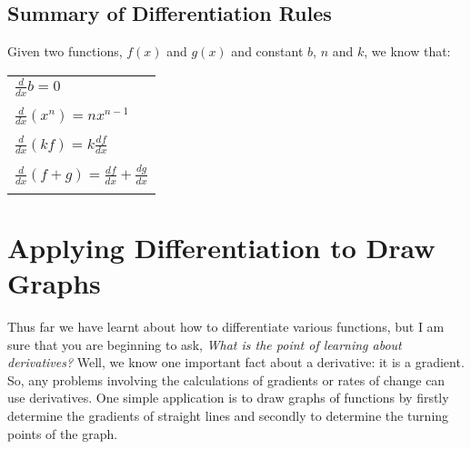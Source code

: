 \subsection{Summary of Differentiation Rules}
\label{md:summ}

Given two functions, $f(x)$ and $g(x)$ and constant $b$, $n$ and $k$, we know that:
\begin{center}
\begin{tabular}{l}
$\frac{d}{dx} b = 0$\\
\\
$\frac{d}{dx} (x^n) = nx^{n-1}$\\
\\
$\frac{d}{dx} (kf) = k\frac{df}{dx}$\\
\\
$\frac{d}{dx} (f+g)= \frac{df}{dx}+\frac{dg}{dx}$\\
\\
\end{tabular}
\end{center}


\section{Applying Differentiation to Draw Graphs}
\label{md:graphs}

Thus far we have learnt about how to differentiate various functions, but I am sure that you are beginning to ask, \textit{What is the point of learning about derivatives?} Well, we know one important fact about a derivative: it is a gradient. So, any problems involving the calculations of gradients or rates of change can use derivatives. One simple application is to draw graphs of functions by firstly determine the gradients of straight lines and secondly to determine the turning points of the graph.

